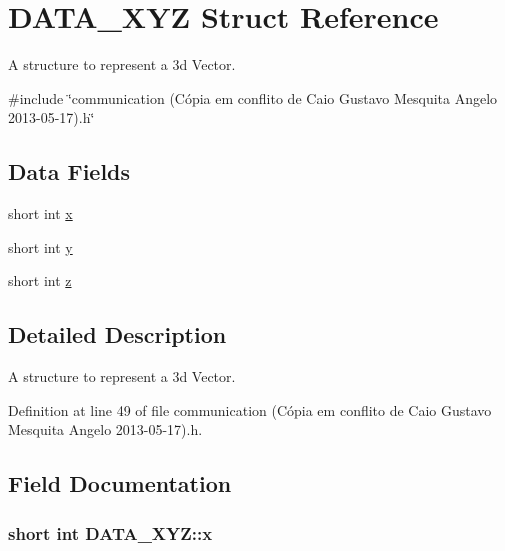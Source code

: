 \hypertarget{structDATA__XYZ}{\section{D\-A\-T\-A\-\_\-\-X\-Y\-Z Struct Reference}
\label{structDATA__XYZ}
}


A structure to represent a 3d Vector.  




{\ttfamily \#include \char`\"{}communication (\-Cópia em conflito de Caio Gustavo Mesquita Angelo 2013-\/05-\/17).\-h\char`\"{}}

\subsection*{Data Fields}
\begin{DoxyCompactItemize}
\item 
short int \hyperlink{structDATA__XYZ_a54c1596e9f9969fd9c21e8458024ecfb}{x}
\item 
short int \hyperlink{structDATA__XYZ_a94bbb1c889bf53eb6a5fffa2b39322cf}{y}
\item 
short int \hyperlink{structDATA__XYZ_a69e89ab0ec6e5d72fc5d54f62cc07fb5}{z}
\end{DoxyCompactItemize}


\subsection{Detailed Description}
A structure to represent a 3d Vector. 

Definition at line 49 of file communication (\-Cópia em conflito de Caio Gustavo Mesquita Angelo 2013-\/05-\/17).\-h.



\subsection{Field Documentation}
\hypertarget{structDATA__XYZ_a54c1596e9f9969fd9c21e8458024ecfb}{
\subsubsection[{x}]{\setlength{\rightskip}{0pt plus 5cm}short int D\-A\-T\-A\-\_\-\-X\-Y\-Z\-::x}}\label{structDATA__XYZ_a54c1596e9f9969fd9c21e8458024ecfb}


